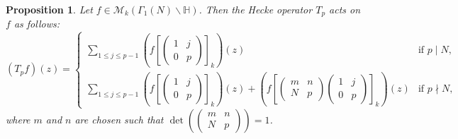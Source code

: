 \documentclass[12pt]{book}
\newtheorem{proposition}{Proposition}[section]
\theoremstyle{definition}\newframedtheorem{method}{Method}
\newcommand{\mc}{\mathcal}
\renewcommand{\H}{\mathbb{H}}
\newcommand{\G}{\Gamma}
\newcommand{\<}{\langle}
\renewcommand{\>}{\rangle}
\begin{document}
      \begin{proposition}\label{prop:explicit_description_of_Hecke_operators}
        Let $f \in \mc{M}_{k}(\G_{1}(N)\backslash\H)$. Then the Hecke operator $T_{p}$ acts on $f$ as follows:
        \[
          (T_{p}f)(z) = \begin{cases} \displaystyle\sum_{1 \le j \le p-1}\left(f\left[\begin{pmatrix} 1 & j \\ 0 & p \end{pmatrix}\right]_{k}\right)(z) & \text{if $p \mid N$}, \\ \displaystyle\sum_{1 \le j \le p-1}\left(f\left[\begin{pmatrix} 1 & j \\ 0 & p \end{pmatrix}\right]_{k}\right)(z)+\left(f\left[\begin{pmatrix} m & n \\ N & p \end{pmatrix}\begin{pmatrix} 1 & j \\ 0 & p \end{pmatrix}\right]_{k}\right)(z) & \text{if $p \nmid N$}, \end{cases}
        \]
        where $m$ and $n$ are chosen such that $\det\left(\begin{pmatrix} m & n \\ N & p \end{pmatrix}\right) = 1$.
      \end{proposition}
\end{document}
